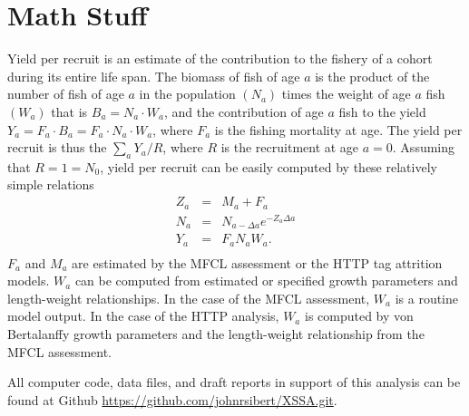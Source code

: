 \documentclass[12pt,letterpaper]{article}
\begin{document}
\section*{Math Stuff}
Yield per recruit is an estimate of the contribution to the fishery of
a cohort during its entire life span.
The biomass of fish of age $a$ is the product of the number of fish
of age $a$ in the population $(N_a)$ times the weight of age $a$ fish
$(W_a)$ that is $B_a=N_a\cdot W_a$, and the contribution of age $a$
fish to the yield $Y_a=F_a\cdot B_a = F_a\cdot N_a\cdot W_a$, 
where $F_a$ is the fishing mortality at age.  
The yield per recruit is thus the $\sum_a Y_a/R$, where $R$ is the
recruitment at age $a=0$.
%
Assuming that $R = 1 = N_0$, yield per recruit can be easily computed by these
relatively simple relations
\begin{eqnarray}
Z_a &=& M_a +F_a \\
N_a &=& N_{a-\Delta a}e^{-Z_a\Delta a}\\
Y_a &=& F_aN_aW_a.\\
\end{eqnarray}
$F_a$ and $M_a$ are estimated by the MFCL assessment or the HTTP
tag attrition models.
$W_a$ can be computed from estimated or specified
growth parameters and length-weight relationships. In the case of the
MFCL assessment, $W_a$ is a routine model output. In the case of the
HTTP analysis, $W_a$ is computed by von Bertalanffy growth parameters
and the length-weight relationship from the MFCL assessment.

All computer code, data files, and draft reports in support of this
analysis can be found at Github
\url{https://github.com/johnrsibert/XSSA.git}.
\end{document}
